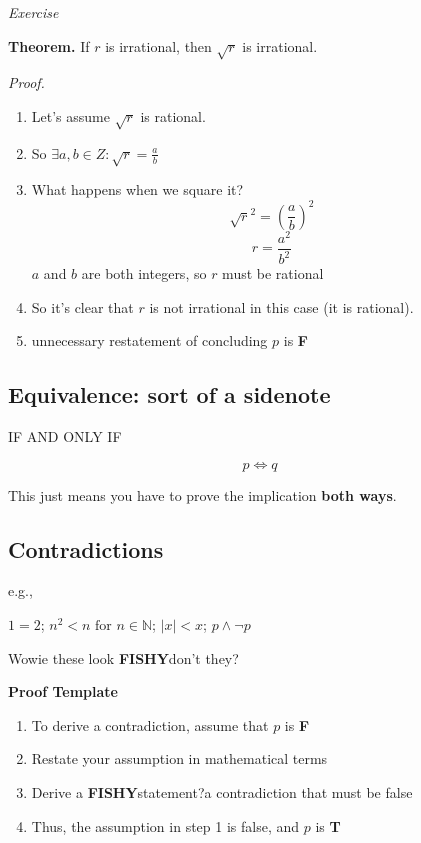 \documentclass{article}
\begin{document}
\noindent\textit{Exercise}

\noindent\textbf{Theorem.} If $r$ is irrational, then $\sqrt{r}$ is irrational.

\noindent\textit{Proof.}
\begin{enumerate}
\item Let's assume $\sqrt{r}$ is rational.
\item So $\exists a,b \in Z : \sqrt{r} = \frac{a}{b}$
\item What happens when we square it? $$\sqrt{r}^2 = (\frac{a}{b})^2$$ $$r = \frac{a^2}{b^2}$$ $a$ and $b$ are both integers, so $r$ must be rational
\item So it's clear that $r$ is not irrational in this case (it is rational).
\item unnecessary restatement of concluding $p$ is \textbf{F}
\end{enumerate}

\subsection*{Equivalence: sort of a sidenote} 
\begin{center}
IF AND ONLY IF
\end{center}
$$p \iff q$$

This just means you have to prove the implication \textbf{both ways}.

\subsection*{Contradictions}

e.g.,
\begin{center}
$1=2$;     $n^2 < n \text{ for } n \in \mathbb{N}$;     $| x | <  x$;     $p \wedge \neg p$
\end{center}

Wowie these look \Large\textbf{FISHY}\normalsize don't they?

\noindent\textbf{Proof Template}
\begin{enumerate}
\item To derive a contradiction, assume that $p$ is \textbf{F}
\item Restate your assumption in mathematical terms
\item Derive a \LARGE\textbf{FISHY}\normalsize statement?a contradiction that must be false
\item Thus, the assumption in step 1 is false, and $p$ is \textbf{T}
\end{enumerate}
\end{document}
